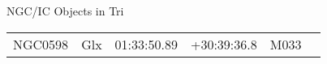 \begin{block}{NGC/IC Objects in Tri}
  \centering
  \begin{tabularx}{\textwidth}{llrrll} 
    NGC0598 & Glx & 01:33:50.89 & +30:39:36.8  & M033 \\ 
  \end{tabularx}
\end{block}